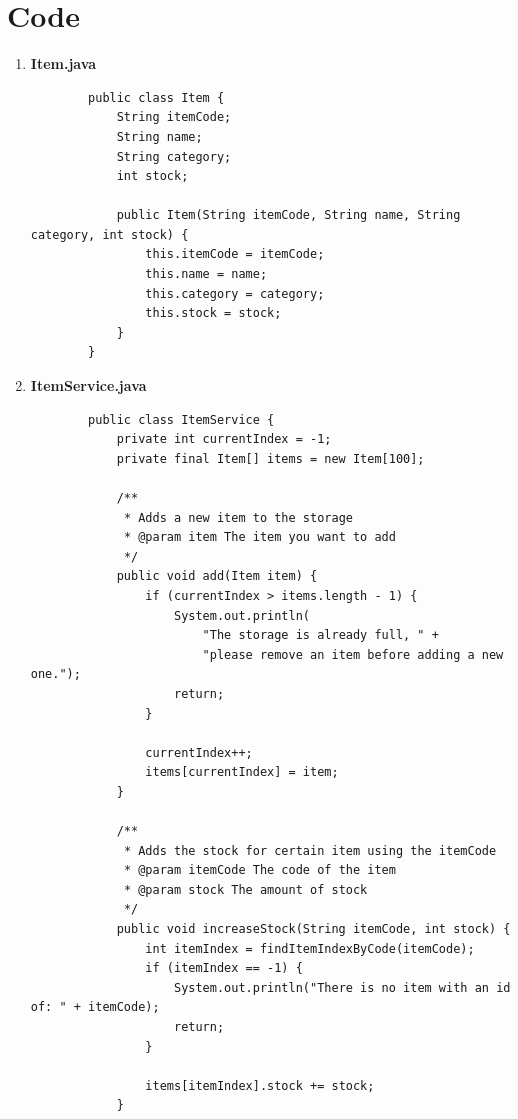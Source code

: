 \documentclass[12pt,titlepage]{article}
\begin{document}
\pagebreak

\section{Code}
\begin{enumerate}
    \item {
        \textbf{Item.java}

        \begin{verbatim}
        public class Item {
            String itemCode;
            String name;
            String category;
            int stock;

            public Item(String itemCode, String name, String category, int stock) {
                this.itemCode = itemCode;
                this.name = name;
                this.category = category;
                this.stock = stock;
            }
        }
        \end{verbatim}
    }
    \item {
        \textbf{ItemService.java}

        \begin{verbatim}
        public class ItemService {
            private int currentIndex = -1;
            private final Item[] items = new Item[100];

            /**
             * Adds a new item to the storage
             * @param item The item you want to add
             */
            public void add(Item item) {
                if (currentIndex > items.length - 1) {
                    System.out.println(
                        "The storage is already full, " +
                        "please remove an item before adding a new one.");
                    return;
                }

                currentIndex++;
                items[currentIndex] = item;
            }

            /**
             * Adds the stock for certain item using the itemCode
             * @param itemCode The code of the item
             * @param stock The amount of stock
             */
            public void increaseStock(String itemCode, int stock) {
                int itemIndex = findItemIndexByCode(itemCode);
                if (itemIndex == -1) {
                    System.out.println("There is no item with an id of: " + itemCode);
                    return;
                }

                items[itemIndex].stock += stock;
            }


\end{verbatim}}
\end{enumerate}
\end{document}
